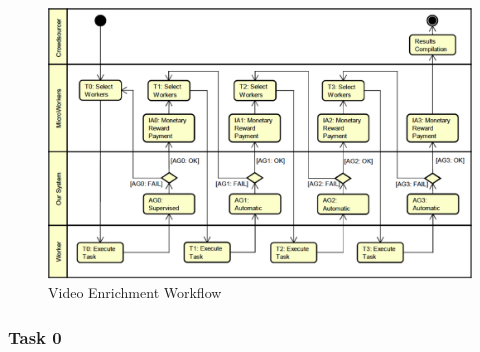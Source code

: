 \begin{figure}[h]
	\centerline{\includegraphics[scale=0.235] {figure/case}}
	\caption{Video Enrichment Workflow}
	\label{workflow}
\end{figure}


\subsubsection{Task 0}


